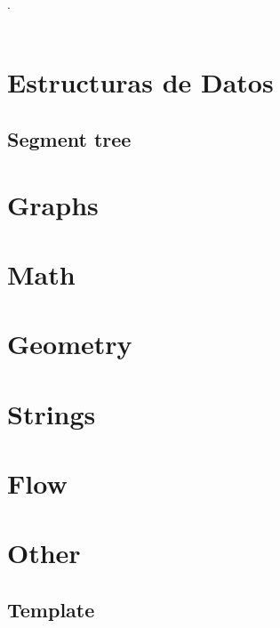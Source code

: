 

\def\title{Competitive Programing Reference}
.\\[0.2cm]
 \\[0.5cm]
\tableofcontents\newpage

\section{Estructuras de Datos}
\subsection{Segment tree}

\section{Graphs}

\section{Math}

\section{Geometry}


\section{Strings}


\section{Flow}


\section{Other}
	\subsection{Template}




